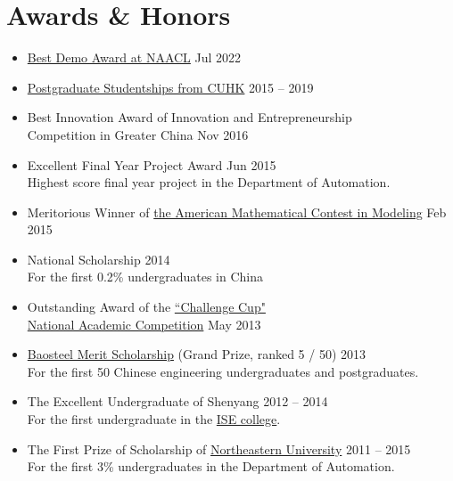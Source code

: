
\section{\sc Awards \& Honors}

\begin{itemize}
    \item \href{https://2022.naacl.org/blog/best-demo-award/}{Best Demo Award at NAACL} \hfill Jul 2022
    \item \href{https://www.gs.cuhk.edu.hk/admissions/scholarships-fees/scholarships}{Postgraduate Studentships from CUHK} \hfill 2015 -- 2019
    \item Best Innovation Award of Innovation and Entrepreneurship \\Competition in Greater China \hfill Nov 2016
    \item Excellent Final Year Project Award \hfill Jun 2015 \\
        Highest score final year project in the Department of Automation.
    \item Meritorious Winner of \href{https://www.comap.com/undergraduate/contests/}{the American Mathematical Contest in Modeling} \hfill Feb 2015
    \item National Scholarship \hfill 2014 \\
        For the first 0.2\% undergraduates in China
    \item Outstanding Award of the \href{http://www.tiaozhanbei.net/}{``Challenge Cup" \\National Academic Competition} \hfill May 2013
    \item \href{http://www.bsef.baosteel.com/honor0.aspx}{Baosteel Merit Scholarship} (Grand Prize, ranked 5 / 50) \hfill 2013 \\
        For the first 50 Chinese engineering undergraduates and postgraduates.
    \item The Excellent Undergraduate of Shenyang \hfill 2012 -- 2014 \\
        For the first undergraduate in the \href{http://www.ise.neu.edu.cn/yingwen/main.htm}{ISE college}.
    \item The First Prize of Scholarship of \href{http://english.neu.edu.cn/}{Northeastern University} \hfill 2011 -- 2015 \\
        For the first 3\% undergraduates in the Department of Automation.
\end{itemize}
